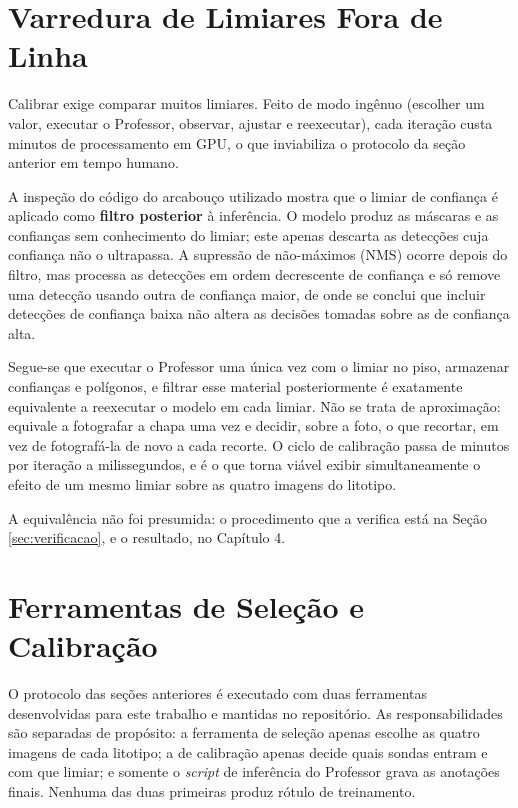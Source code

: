 \section{Varredura de Limiares Fora de Linha}
\label{sec:varredura}

Calibrar exige comparar muitos limiares. Feito de modo ingênuo (escolher um valor, executar o Professor, observar, ajustar e reexecutar), cada iteração custa minutos de processamento em GPU, o que inviabiliza o protocolo da seção anterior em tempo humano.

A inspeção do código do arcabouço utilizado mostra que o limiar de confiança é aplicado como \textbf{filtro posterior} à inferência. O modelo produz as máscaras e as confianças sem conhecimento do limiar; este apenas descarta as detecções cuja confiança não o ultrapassa. A supressão de não-máximos (NMS) ocorre depois do filtro, mas processa as detecções em ordem decrescente de confiança e só remove uma detecção usando outra de confiança maior, de onde se conclui que incluir detecções de confiança baixa não altera as decisões tomadas sobre as de confiança alta.

Segue-se que executar o Professor uma única vez com o limiar no piso, armazenar confianças e polígonos, e filtrar esse material posteriormente é exatamente equivalente a reexecutar o modelo em cada limiar. Não se trata de aproximação: equivale a fotografar a chapa uma vez e decidir, sobre a foto, o que recortar, em vez de fotografá-la de novo a cada recorte. O ciclo de calibração passa de minutos por iteração a milissegundos, e é o que torna viável exibir simultaneamente o efeito de um mesmo limiar sobre as quatro imagens do litotipo.

A equivalência não foi presumida: o procedimento que a verifica está na Seção \ref{sec:verificacao}, e o resultado, no Capítulo 4.

\section{Ferramentas de Seleção e Calibração}
\label{sec:ferramentas}

O protocolo das seções anteriores é executado com duas ferramentas desenvolvidas para este trabalho e mantidas no repositório. As responsabilidades são separadas de propósito: a ferramenta de seleção apenas escolhe as quatro imagens de cada litotipo; a de calibração apenas decide quais sondas entram e com que limiar; e somente o \textit{script} de inferência do Professor grava as anotações finais. Nenhuma das duas primeiras produz rótulo de treinamento.

